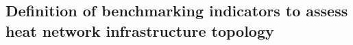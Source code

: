 \subsection{Definition of benchmarking indicators to assess heat network infrastructure topology}





%
%
%
